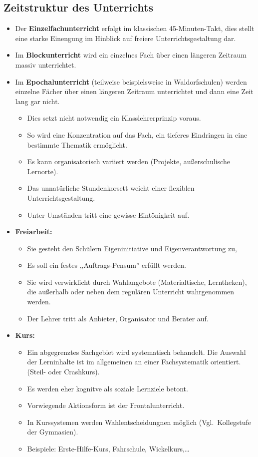 \subsection{Zeitstruktur des Unterrichts}

\begin{itemize}
\item Der \textbf{Einzelfachunterricht} erfolgt im klassischen
45-Minuten-Takt, dies stellt eine starke Einengung
im Hinblick auf freiere Unterrichtsgestaltung dar.
\item Im \textbf{Blockunterricht} wird ein einzelnes Fach \"{u}ber einen
l\"{a}ngeren Zeitraum massiv unterrichtet.
\item Im \textbf{Epochalunterricht} (teilweise beispielsweise in
Waldorfschulen) werden einzelne F\"{a}cher \"{u}ber einen
l\"{a}ngeren Zeitraum unterrichtet und dann eine Zeit lang gar nicht.
\begin{itemize}
\item Dies setzt nicht notwendig ein Klasslehrerprinzip voraus.
\item So wird eine Konzentration auf das Fach, ein tieferes
Eindringen in
eine bestimmte Thematik erm\"{o}glicht.
\item Es kann organisatorisch variiert werden (Projekte,
au{\ss}erschulische Lernorte).
\item Das unnat\"{u}rliche Stundenkorsett weicht einer
flexiblen Unterrichtsgestaltung.
\item Unter Umst\"{a}nden tritt eine gewisse Eint\"{o}nigkeit auf.
\end{itemize}
\item
\textbf{Freiarbeit:}
\begin{itemize}
\item Sie gesteht den Sch\"{u}lern Eigeninitiative und
Eigenverantwortung zu,
\item Es soll ein festes ,,Auftrags-Pensum'' erf\"{u}llt werden.
\item Sie wird verwirklicht durch Wahlangebote
(Materialtische, Lerntheken), die
au{\ss}erhalb oder neben dem regul\"{a}ren Unterricht
wahrgenommen werden.
\item Der Lehrer tritt als Anbieter, Organisator und Berater auf.
\end{itemize}

\item \textbf{Kurs:}
\begin{itemize}
\item Ein abgegrenztes Sachgebiet wird systematisch behandelt.
Die Auswahl der Lerninhalte ist im
allgemeinen an einer Fachsystematik orientiert.
(Steil- oder Crashkurs).
\item Es werden eher kognitve als soziale Lernziele betont.
\item Vorwiegende Aktionsform ist der Frontalunterricht.
\item In Kurssystemen werden Wahlentscheidungnen m\"{o}glich
(Vgl.\ Kollegstufe der Gymnasien).
\item Beispiele: Erste-Hilfe-Kurs, Fahrschule, Wickelkurs,\dots
\end{itemize}
\end{itemize}



